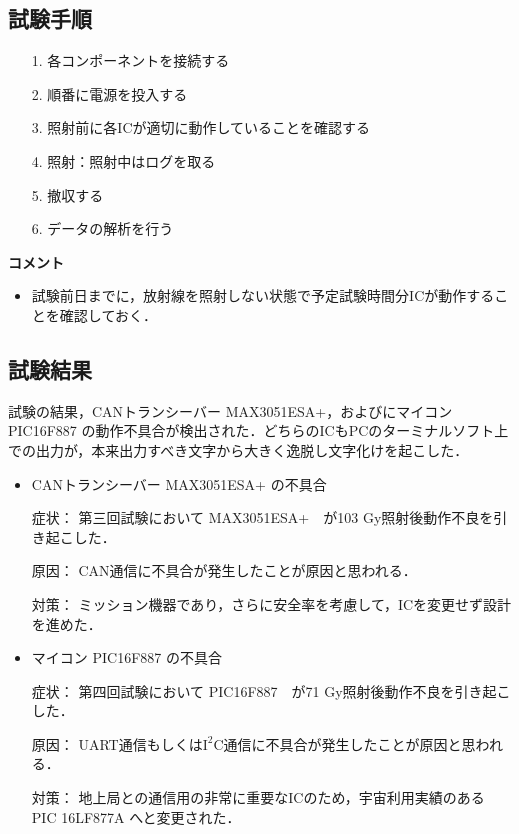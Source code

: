 \subsection{試験手順}
\begin{itemize}
	\item[　1.　] 各コンポーネントを接続する
	\item[　2.　]  順番に電源を投入する
	\item[　3.　]  照射前に各ICが適切に動作していることを確認する
	\item[　4.　]  照射：照射中はログを取る
	\item[　5.　]  撤収する
	\item[　6.　]  データの解析を行う
\end{itemize}

\vspace{2ex} 
\textbf{コメント}
\begin{itemize}
	\item 試験前日までに，放射線を照射しない状態で予定試験時間分ICが動作することを確認しておく．
\end{itemize}

\subsection{試験結果}

試験の結果，CANトランシーバー  MAX3051ESA+，およびにマイコン PIC16F887 の動作不具合が検出された．どちらのICもPCのターミナルソフト上での出力が，本来出力すべき文字から大きく逸脱し文字化けを起こした．

\begin{itemize}
	\item CANトランシーバー MAX3051ESA+ の不具合
	\item[　症状：] 第三回試験において MAX3051ESA+　が103 Gy照射後動作不良を引き起こした．
	\item[　原因：] CAN通信に不具合が発生したことが原因と思われる．
	\item[　対策：] ミッション機器であり，さらに安全率を考慮して，ICを変更せず設計を進めた．
\end{itemize}

\begin{itemize}
	\item マイコン PIC16F887 の不具合
	\item[　症状：] 第四回試験において PIC16F887　が71 Gy照射後動作不良を引き起こした．
	\item[　原因：] UART通信もしくは$\textrm{I}^2 \textrm{C}$通信に不具合が発生したことが原因と思われる．
	\item[　対策：] 地上局との通信用の非常に重要なICのため，宇宙利用実績のある PIC 16LF877A へと変更された．
\end{itemize}

